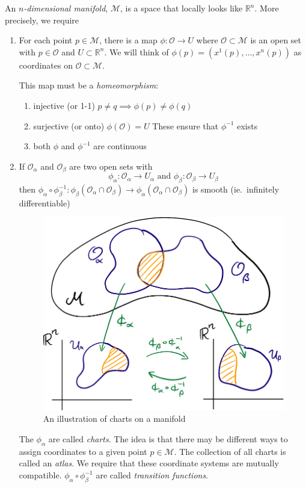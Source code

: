 An \emph{$n$-dimensional manifold}, $\mathcal{M}$, is a space that locally looks like $\mathbb{R}^n$.
More precisely, we require
\begin{enumerate}
  \item For each point $p \in \mathcal{M}$, there is a map $\phi \colon \mathcal{O} \to U$ where $\mathcal{O} \subset \mathcal{M}$ is an open set with $p \in \mathcal{O}$ and $U \subset \mathbb{R}^n$.
    We will think of $\phi(p) = (x^1(p), \dots, x^n(p))$ as coordinates on $\mathcal{O} \subset \mathcal{M}$.

    This map must be a \emph{homeomorphism}:
    \begin{enumerate}
      \item injective (or 1-1) $p \neq q \implies \phi(p) \neq \phi(q)$
      \item surjective (or onto) $\phi(\mathcal{O}) = U$
	These ensure that $\phi^{-1}$ exists
      \item both $\phi$ and $\phi^{-1}$ are continuous
    \end{enumerate}
  \item If $\mathcal{O}_\alpha$ and $\mathcal{O}_\beta$ are two open sets with 
    \begin{equation}
      \phi_\alpha: \mathcal{O}_\alpha \to U_\alpha \text{ and } \phi_\beta: \mathcal{O}_\beta \to U_\beta
    \end{equation}
    then $\phi_\alpha \circ \phi^{-1}_\beta: \phi_\beta(\mathcal{O}_\alpha \cap \mathcal{O}_{\beta}) \to \phi_\alpha (\mathcal{O}_\alpha \cap \mathcal{O}_\beta)$ is smooth (ie.~infinitely differentiable)

    \begin{figure}[htpb]
      \centering
      \includegraphics[width=0.6\linewidth]{lectures/F1.pdf}
      \caption{An illustration of charts on a manifold}
      \label{fig:manifold}
    \end{figure}

    The $\phi_\alpha$ are called \emph{charts}. The idea is that there may be different ways to assign coordinates to a given point $p \in \mathcal{M}$.
    The collection of all charts is called an \emph{atlas}.
    We require that these coordinate systems are mutually compatible.
    $\phi_\alpha \circ \phi_\beta^{-1}$ are called \emph{transition functions}.
\end{enumerate}

